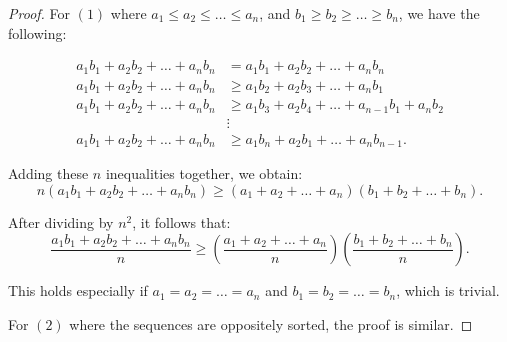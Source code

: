 \documentclass[
	12pt, %
	fleqn, %
	a4paper, %
]{LegrandOrangeBook}
\begin{document}
\begin{proof}
    For \( (1) \) where \( a_1 \leq a_2 \leq \ldots \leq a_n \), and \( b_1 \geq b_2 \geq \ldots \geq b_n \), we have the following:

\begin{align*}
    a_1b_1 + a_2b_2 + \ldots + a_nb_n &= a_1b_1 + a_2b_2 + \ldots + a_nb_n \\
    a_1b_1 + a_2b_2 + \ldots + a_nb_n &\geq a_1b_2 + a_2b_3 + \ldots + a_nb_1 \\
    a_1b_1 + a_2b_2 + \ldots + a_nb_n &\geq a_1b_3 + a_2b_4 + \ldots + a_{n-1}b_1 + a_nb_2 \\
    &\vdots \\
    a_1b_1 + a_2b_2 + \ldots + a_nb_n &\geq a_1b_n + a_2b_1 + \ldots + a_nb_{n-1}.
\end{align*}

Adding these \( n \) inequalities together, we obtain:
\[ n(a_1b_1 + a_2b_2 + \ldots + a_nb_n) \geq (a_1 + a_2 + \ldots + a_n)(b_1 + b_2 + \ldots + b_n). \]

After dividing by \( n^2 \), it follows that:
\[ \frac{a_1b_1 + a_2b_2 + \ldots + a_nb_n}{n} \geq \left( \frac{a_1 + a_2 + \ldots + a_n}{n} \right)\left( \frac{b_1 + b_2 + \ldots + b_n}{n} \right). \]

This holds especially if \( a_1 = a_2 = \ldots = a_n \) and \( b_1 = b_2 = \ldots = b_n \), which is trivial.

For \( (2) \) where the sequences are oppositely sorted, the proof is similar.
\end{proof}
\end{document}
